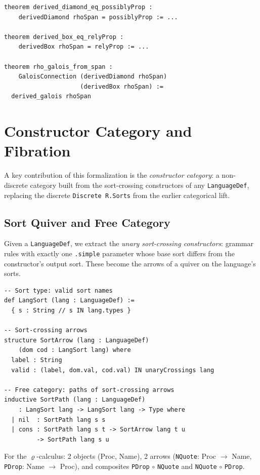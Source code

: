 \documentclass[]{article}
\newcommand{\code}[1]{\texttt{#1}}
\newcommand{\rhocalc}{\ensuremath{\varrho}}
\begin{document}
\begin{lstlisting}[caption={Derived modalities equal concrete (DerivedModalities.lean)}]
theorem derived_diamond_eq_possiblyProp :
    derivedDiamond rhoSpan = possiblyProp := ...

theorem derived_box_eq_relyProp :
    derivedBox rhoSpan = relyProp := ...

theorem rho_galois_from_span :
    GaloisConnection (derivedDiamond rhoSpan)
                     (derivedBox rhoSpan) :=
  derived_galois rhoSpan
\end{lstlisting}

\section{Constructor Category and Fibration}
\label{sec:constructor-cat}

A key contribution of this formalization is the \emph{constructor category}: a
non-discrete category built from the sort-crossing constructors of any
\code{LanguageDef}, replacing the discrete \code{Discrete R.Sorts} from the
earlier categorical lift.

\subsection{Sort Quiver and Free Category}

Given a \code{LanguageDef}, we extract the \emph{unary sort-crossing constructors}:
grammar rules with exactly one \code{.simple} parameter whose base sort differs
from the constructor's output sort.  These become the arrows of a quiver on the
language's sorts.

\begin{lstlisting}[caption={Constructor category (ConstructorCategory.lean)}]
-- Sort type: valid sort names
def LangSort (lang : LanguageDef) :=
  { s : String // s IN lang.types }

-- Sort-crossing arrows
structure SortArrow (lang : LanguageDef)
    (dom cod : LangSort lang) where
  label : String
  valid : (label, dom.val, cod.val) IN unaryCrossings lang

-- Free category: paths of sort-crossing arrows
inductive SortPath (lang : LanguageDef)
    : LangSort lang -> LangSort lang -> Type where
  | nil  : SortPath lang s s
  | cons : SortPath lang s t -> SortArrow lang t u
         -> SortPath lang s u
\end{lstlisting}

For the \rhocalc{}-calculus: 2 objects (Proc, Name), 2 arrows
(\code{NQuote}: Proc $\to$ Name, \code{PDrop}: Name $\to$ Proc),
and composites \code{PDrop} $\circ$ \code{NQuote} and
\code{NQuote} $\circ$ \code{PDrop}.
\end{document}
